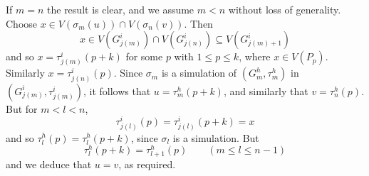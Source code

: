 If $m = n$ the result is clear, and we assume $m < n$ without loss of generality. Choose $x \in V(\sigma_m(u)) \cap V(\sigma_n(v))$. Then
\begin{equation*}
x \in V(G^i_{j(m)}) \cap V(G^i_{j(n)}) \subseteq V(G^i_{j(m)+1})
\end{equation*}
and so $x = \tau^i_{j(m)}(p+k)$ for some $p$ with $1 \le p \le k$, where $x \in V(P_p)$. Similarly $x = \tau^i_{j(n)}(p)$. Since $\sigma_m$ is a simulation of $(G^h_m, \tau^h_m)$ in $(G^i_{j(m)}, \tau^i_{j(m)})$, it follows that $u = \tau^h_m(p+k)$, and similarly that $v = \tau^h_n(p)$. But for $m < l < n$,
\begin{equation*}
\tau^i_{j(l)}(p) = \tau^i_{j(l)}(p+k) = x
\end{equation*}
and so $\tau^h_l(p) = \tau^h_l(p+k)$, since $\sigma_l$ is a simulation. But
\begin{equation*}
\tau^h_l(p+k) = \tau^h_{l+1}(p) \qquad (m \le l \le n-1)
\end{equation*}
and we deduce that $u = v$, as required.
